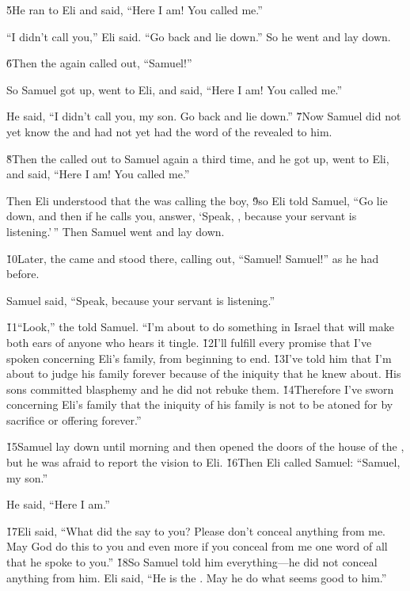 \v{5}He ran to Eli and said, ``Here I am! You called me.''

``I didn't call you,'' Eli said. ``Go back and lie down.'' So he went and lay down.

\v{6}Then the  again called out, ``Samuel!''

So Samuel got up, went to Eli, and said, ``Here I am! You called me.''

He said, ``I didn't call you, my son. Go back and lie down.'' \v{7}Now Samuel did not yet know the  and had not yet had the word of the  revealed to him.

\v{8}Then the  called out to Samuel again a third time, and he got up, went to Eli, and said, ``Here I am! You called me.''

Then Eli understood that the  was calling the boy, \v{9}so Eli told Samuel, ``Go lie down, and then if he calls you, answer, `Speak, , because your servant is listening.'\,'' Then Samuel went and lay down.

\v{10}Later, the  came and stood there, calling out, ``Samuel! Samuel!'' as he had before.

Samuel said, ``Speak, because your servant is listening.''

\v{11}``Look,'' the  told Samuel. ``I'm about to do something in Israel that will make both ears of anyone who hears it tingle. \v{12}I'll fulfill every promise that I've spoken concerning Eli's family, from beginning to end. \v{13}I've told him that I'm about to judge his family forever because of the iniquity that he knew about. His sons committed blasphemy and he did not rebuke them. \v{14}Therefore I've sworn concerning Eli's family that the iniquity of his family is not to be atoned for by sacrifice or offering forever.''

\v{15}Samuel lay down until morning and then opened the doors of the house of the , but he was afraid to report the vision to Eli. \v{16}Then Eli called Samuel: ``Samuel, my son.''

He said, ``Here I am.''

\v{17}Eli said, ``What did the  say to you? Please don't conceal anything from me. May God do this to you and even more if you conceal from me one word of all that he spoke to you.'' \v{18}So Samuel told him everything---he did not conceal anything from him. Eli said, ``He is the . May he do what seems good to him.''

